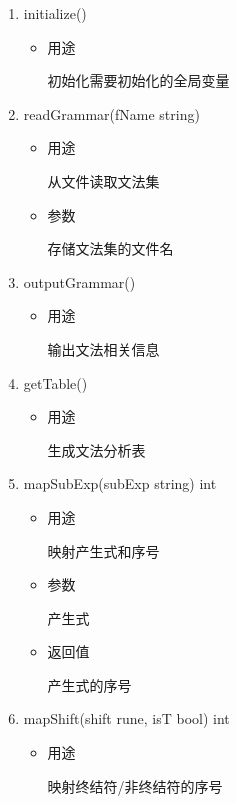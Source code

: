 \documentclass[fontset=none,UTF8,a4paper,zihao=-4]{ctexart}
\begin{document}
\begin{enumerate}
\item initialize()

\begin{itemize}
\item 用途

初始化需要初始化的全局变量
\end{itemize}

\item readGrammar(fName string)

\begin{itemize}
\item 用途

从文件读取文法集

\item 参数

存储文法集的文件名
\end{itemize}

\item outputGrammar()

\begin{itemize}
\item 用途

输出文法相关信息
\end{itemize}

\item getTable()

\begin{itemize}
\item 用途

生成文法分析表
\end{itemize}

\item mapSubExp(subExp string) int

\begin{itemize}
\item 用途

映射产生式和序号

\item 参数

产生式

\item 返回值

产生式的序号
\end{itemize}

\item mapShift(shift rune, isT bool) int

\begin{itemize}
\item 用途

映射终结符/非终结符的序号


\end{itemize}
\end{enumerate}
\end{document}
